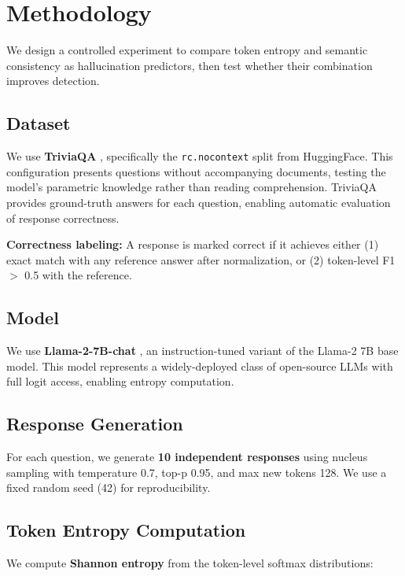 \section{Methodology}

We design a controlled experiment to compare token entropy and semantic consistency as hallucination predictors, then test whether their combination improves detection.

\subsection{Dataset}

We use \textbf{TriviaQA} \citep{joshi2017triviaqa}, specifically the \texttt{rc.nocontext} split from HuggingFace. This configuration presents questions without accompanying documents, testing the model's parametric knowledge rather than reading comprehension. TriviaQA provides ground-truth answers for each question, enabling automatic evaluation of response correctness.

\textbf{Correctness labeling:} A response is marked correct if it achieves either (1) exact match with any reference answer after normalization, or (2) token-level F1 $>$ 0.5 with the reference.

\subsection{Model}

We use \textbf{Llama-2-7B-chat} \citep{touvron2023llama}, an instruction-tuned variant of the Llama-2 7B base model. This model represents a widely-deployed class of open-source LLMs with full logit access, enabling entropy computation.

\subsection{Response Generation}

For each question, we generate \textbf{10 independent responses} using nucleus sampling with temperature 0.7, top-p 0.95, and max new tokens 128. We use a fixed random seed (42) for reproducibility.

\subsection{Token Entropy Computation}

We compute \textbf{Shannon entropy} from the token-level softmax distributions:

